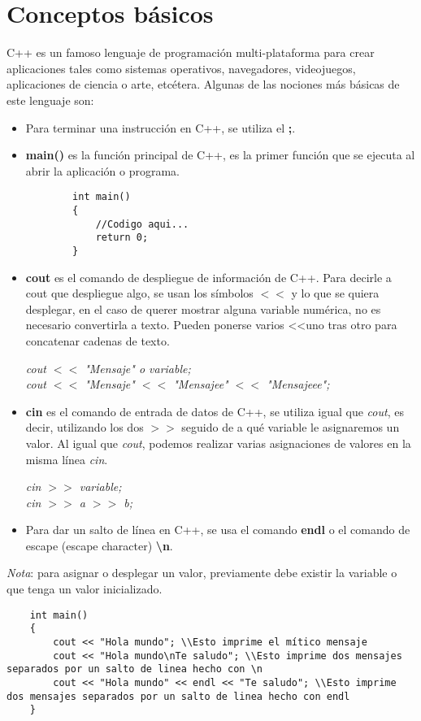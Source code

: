 \section{Conceptos básicos}
C++ es un famoso lenguaje de programación multi-plataforma para crear aplicaciones tales como sistemas operativos, navegadores, videojuegos, aplicaciones de ciencia o arte, etcétera. Algunas de las nociones más básicas de este lenguaje son:
\begin{itemize}
    \item Para terminar una instrucción en C++, se utiliza el \textbf{;}.
    \item \textbf{main()} es la función principal de C++, es la primer función que se ejecuta al abrir la aplicación o programa.
    \begin{lstlisting}
        int main()
        {
            //Codigo aqui...
            return 0;
        }
    \end{lstlisting}
    \item \textbf{cout} es el comando de despliegue de información de C++. Para decirle a cout que despliegue algo, se usan los símbolos \textbf{$<<$} y lo que se quiera desplegar, en el caso de querer mostrar alguna variable numérica, no es necesario convertirla a texto. Pueden ponerse varios \textless\textless uno tras otro para concatenar cadenas de texto.
    \begin{center}
        \textit{cout $<<$ "Mensaje" o variable;\\
                cout $<<$ "Mensaje" $<<$ "Mensajee" $<<$ "Mensajeee";}
    \end{center}
    \item \textbf{cin} es el comando de entrada de datos de C++, se utiliza igual que \textit{cout}, es decir, utilizando los dos \textbf{$>>$} seguido de a qué variable le asignaremos un valor. Al igual que \textit{cout}, podemos realizar varias asignaciones de valores en la misma línea \textit{cin}.
    \begin{center}
        \textit{cin $>>$ variable;\\
                cin $>>$ a $>>$ b;}
    \end{center}
    \item Para dar un salto de línea en C++, se usa el comando \textbf{endl} o el comando de escape (escape character) \textbf{\textbackslash n}.
\end{itemize}
\textit{Nota}: para asignar o desplegar un valor, previamente debe existir la variable o que tenga un valor inicializado.
\begin{lstlisting}
    int main()
    {
        cout << "Hola mundo"; \\Esto imprime el mítico mensaje
        cout << "Hola mundo\nTe saludo"; \\Esto imprime dos mensajes separados por un salto de linea hecho con \n
        cout << "Hola mundo" << endl << "Te saludo"; \\Esto imprime dos mensajes separados por un salto de linea hecho con endl
    }
\end{lstlisting}



